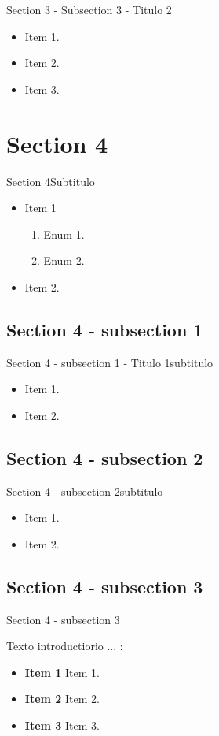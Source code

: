 \documentclass{beamer}
\begin{document}
\begin{frame}{Section 3 - Subsection 3 - Titulo 2}
  \begin{itemize}
      \item Item 1.
      \item Item 2.
      \item Item 3.
  \end{itemize}
\end{frame}

\section{Section 4}
\begin{frame}{Section 4}{Subtitulo}

\begin{itemize}
    \item Item 1
    \begin{enumerate}
        \item Enum 1.
        \item Enum 2.
    \end{enumerate}
    \item Item 2.
\end{itemize}
\end{frame}

\subsection{Section 4 - subsection 1}
\begin{frame}{Section 4 - subsection 1 - Titulo 1}{subtitulo}
\begin{itemize}
    \item Item 1.
    \item Item 2.
\end{itemize}
\end{frame}

\subsection{Section 4 - subsection 2}
\begin{frame}{Section 4 - subsection 2}{subtitulo}
  \begin{itemize}
      \item Item 1.
      \item Item 2.
  \end{itemize}
\end{frame}

\subsection{Section 4 - subsection 3}
\begin{frame}{Section 4 - subsection 3}

Texto introductiorio ... :

\begin{itemize}
\item \textbf{Item 1} Item 1.
\item \textbf{Item 2} Item 2.
\item \textbf{Item 3} Item 3.
\end{itemize}
\end{frame}
\end{document}
